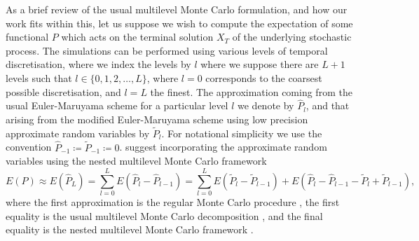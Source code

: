 \documentclass[manuscript,review]{acmart}
\begin{document}
As a brief review of the usual multilevel Monte Carlo formulation, and how our work fits within this, let us suppose we wish to compute the expectation of some functional $ P $ which acts on the terminal solution $ X_T $ of the underlying stochastic process. The simulations can be performed using various levels of temporal discretisation, where we index the levels by $ l $ where we suppose there are $ L+1 $ levels such that $ l\in \{0, 1, 2, \ldots, L\} $, where $ l = 0 $ corresponds to the coarsest possible discretisation, and $ l=L $ the finest. The approximation coming from the usual Euler-Maruyama scheme for a particular level $ l $ we denote by $ \widehat{P}_l $, and that arising from the modified Euler-Maruyama scheme using low precision approximate random variables by $ \widetilde{P}_l $. For notational simplicity we use the convention $ \widehat{P}_{-1} \coloneqq \widetilde{P}_{-1} \coloneqq 0 $. \citet{giles2020approximate,giles2020approximating} suggest incorporating the approximate random variables using the nested multilevel Monte Carlo framework
\begin{equation*}
E(P) 
\approx
E(\widehat{P}_L) 
= 
\sum_{l = 0}^{L} E(\widehat{P}_l - \widehat{P}_{l-1}) 
= 
\sum_{l = 0}^{L} E(\widetilde{P}_l - \widetilde{P}_{l-1}) +  E(\widehat{P}_l - \widehat{P}_{l-1} - \widetilde{P}_l + \widetilde{P}_{l-1}),
\end{equation*}
where the first approximation is the regular Monte Carlo procedure \citep{glasserman2013monte}, the first equality is the usual multilevel Monte Carlo decomposition \citep{giles2008multilevel}, and the final equality is the nested multilevel Monte Carlo framework \citep{giles2020approximate,giles2020approximating}.
\end{document}
